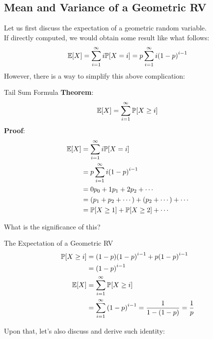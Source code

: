 \subsection{Mean and Variance of a Geometric RV}
Let us first discuss the expectation of a geometric random variable. \\
If directly computed, we would obtain some result like what follows:
\[\mathbb{E}[X] = \sum_{i = 1}^\infty i\mathbb{P}[X = i] = p\sum_{i = 1}^\infty i{(1 - p)}^{i - 1}\]
However, there is a way to simplify this above complication:
\begin{ln-theorem}{Tail Sum Formula}{}
    \textbf{Theorem}:
    \[\mathbb{E}[X] = \sum_{i = 1}^\infty \mathbb{P}[X \geq i]\]
    \tcblower
    \textbf{Proof}:
    \begin{align*}
        \mathbb{E}[X] &= \sum_{i = 1}^\infty i\mathbb{P}[X = i] \\
        &= p\sum_{i = 1}^\infty i{(1 - p)}^{i - 1} \\
        &= 0 p_0 + 1 p_1 + 2 p_2 + \cdots \\
        &= (p_1 + p_2 + \cdots) + (p_2 + \cdots) + \cdots \\
        &= \mathbb{P}[X \geq 1] + \mathbb{P}[X \geq 2] + \cdots
    \end{align*}
\end{ln-theorem}
What is the significance of this?
\begin{ln-theorem}{The Expectation of a Geometric RV}{}
    \begin{align*}
        \mathbb{P}[X \geq i] &= (1 - p){(1 - p)}^{i - 1} + p{(1 - p)}^{i - 1} \\
        &= {(1 - p)}^{i - 1} \\
        \mathbb{E}[X] &= \sum_{i = 1}^\infty \mathbb{P}[X \geq i] \\
        &= \sum_{i = 1}^\infty {(1 - p)}^{i - 1}
        = \frac{1}{1 - (1 - p)} = \frac{1}{p}
    \end{align*}
\end{ln-theorem}
Upon that, let's also discuss and derive such identity:
